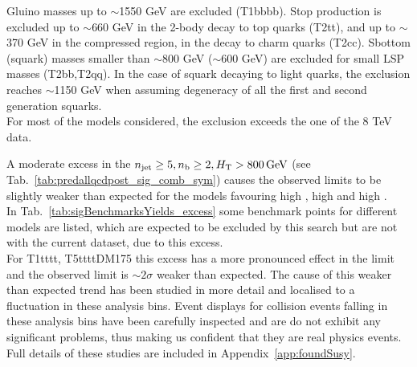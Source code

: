 \newpage
Gluino masses up to $\sim$1550 GeV are excluded (T1bbbb). 
Stop production is excluded up to $\sim$660 GeV in the 2-body decay to top quarks (T2tt), 
and up to $\sim$370 GeV in the compressed region, in the decay to charm quarks (T2cc). 
Sbottom (squark) masses smaller than $\sim$800 GeV ($\sim$600 GeV) are excluded for small LSP masses (T2bb,T2qq). 
In the case of squark decaying to light quarks, the exclusion reaches $\sim$1150 GeV when assuming degeneracy of 
all the first and second generation squarks. \\
For most of the models considered, the exclusion exceeds the one of the 8 TeV data. 

A moderate excess in the $n_{\text{jet}}\geq5, n_{\text{b}}\geq2, \mbox{$H_\text{T}$} > 800 \, \mathrm{GeV}$ (see Tab.~\ref{tab:predallqcdpost_sig_comb_sym})
causes the observed limits to be slightly weaker than expected for the models favouring high \nb, high \nj and high \scalht. \\
In Tab.~\ref{tab:sigBenchmarksYields_excess} some benchmark points for different models are listed, 
which are expected to be excluded by this search but are not with the current dataset, due to this excess. \\
For T1tttt, T5ttttDM175 this excess has a more pronounced effect in the limit and the observed limit is $\sim 2\sigma$ 
weaker than expected. The cause of this weaker than expected trend has been studied in more detail
and localised to a fluctuation in these analysis bins. Event displays for collision events 
falling in these analysis bins have been carefully inspected and are do not exhibit any 
significant problems, thus making us confident that they are real physics events. Full details
of these studies are included in Appendix~\ref{app:foundSusy}.





